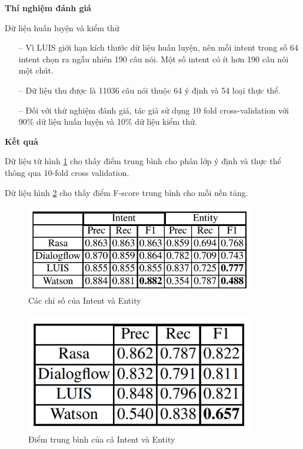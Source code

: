 \textbf{Thí nghiệm đánh giá}

Dữ liệu huấn luyện và kiểm thử
\begin{itemize}
    \item[--] Vì LUIS giới hạn kích thước dữ liệu huấn luyện, nên mỗi intent trong số 64 intent chọn ra ngẫu nhiên 190 câu nói. Một số intent có ít hơn 190 câu nói một chút.
    \item[--] Dữ liệu thu được là 11036 câu nói thuộc 64 ý định và 54 loại thực thể.
    \item[--] Đối với thử nghiệm đánh giá, tác giả sử dụng 10 fold cross-validation với 90\% dữ liệu huấn luyện và 10\% dữ liệu kiểm thử.
\end{itemize}

\textbf{Kết quả}

Dữ liệu từ hình \ref{fig:overallScores4IntentandEntity} cho thấy điểm trung bình cho phân lớp ý định và thực thể thông qua 10-fold cross validation.

Dữ liệu hình \ref{fig:combinedOverallScores} cho thấy điểm F-score trung bình cho mỗi nền tảng.

\begin{figure}[htp]
    \centering
    \includegraphics[width=10cm]{images/comparisonimg/overallScores4IntentandEntity.png}
    \caption{Các chỉ số của Intent và Entity}
    \label{fig:overallScores4IntentandEntity}
\end{figure}

\begin{figure}[htp]
    \centering
    \includegraphics[width=10cm]{images/comparisonimg/combinedOverallScores.png}
    \caption{Điểm trung bình của cả Intent và Entity}
    \label{fig:combinedOverallScores}
\end{figure}

